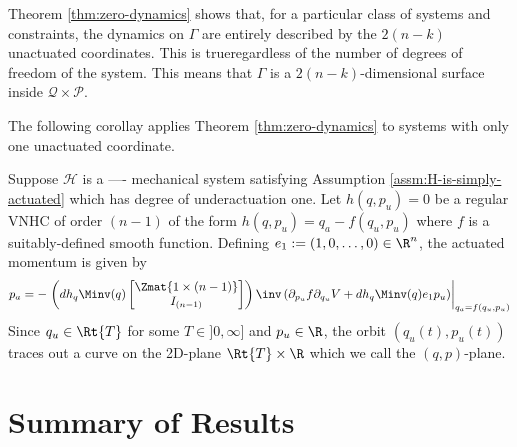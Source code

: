 Theorem \ref{thm:zero-dynamics} shows that, for a particular class of systems
and constraints, the dynamics on \(\Gamma\) are entirely described by the \(2(n-k)\)
unactuated coordinates. 
This is trueregardless of the number of degrees of freedom of the system. 
This means that \(\Gamma\) is a \(2(n-k)\)-dimensional surface inside 
\(\mathcal{Q}\times \mathcal{P}\). 

The following corollay applies Theorem \ref{thm:zero-dynamics} to
systems with only one unactuated coordinate.

\begin{cor}\label{cor:2d-zero-dynamics}
    Suppose \(\mathcal{H}\) is a ---- mechanical system satisfying Assumption
    \ref{assm:H-is-simply-actuated} which has degree of underactuation one.
    Let \(h(q,p_u) = 0\) be a regular VNHC of order \((n-1)\) of the form
    \(h(q,p_u) = q_a - f(q_u,p_u)\)
    where \(f\) is a suitably-defined smooth function.
    Defining \(e_1 := (1,0,\ldots,0) \in \R^n\), the actuated momentum 
    is given by
    \begin{equation}\label{eqn:g-qupu}
        p_a = -\left.\left(dh_q \Minv(q)
        \begin{bmatrix}
            \Zmat{1\times (n-1)}\\
            I_{(n-1)}
        \end{bmatrix}\right)\inv 
        \left(\partial_{p_u}f \partial_{q_u}V + dh_q \Minv(q)e_1 p_u\right) 
            \right|_{q_a =f(q_u,p_u)}
    \end{equation}
    Since \(q_u \in \Rt{T}\) for some \(T \in ]0,\infty]\) and \(p_u \in \R\),
    the orbit \((q_u(t),p_u(t))\) traces out
    a curve on the 2D-plane \(\Rt{T} \times \R\) which we call the \((q,p)\)-plane.
\end{cor}

\section{Summary of Results}
















